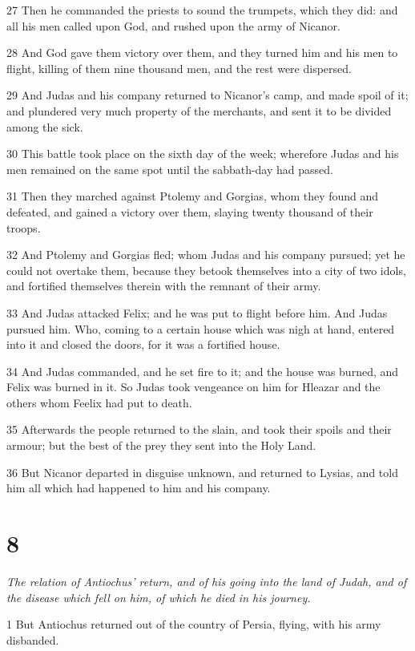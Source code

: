 27 Then he commanded the priests to sound the trumpets, which they did: and all his men called upon God, and rushed upon the army of Nicanor. 

28 And God gave them victory over them, and they turned him and his men to flight, killing of them nine thousand men, and the rest were dispersed. 

29 And Judas and his company returned to Nicanor’s camp, and made spoil of it; and plundered very much property of the merchants, and sent it to be divided among the sick. 

30 This battle took place on the sixth day of the week; wherefore Judas and his men remained on the same spot until the sabbath-day had passed. 

31 Then they marched against Ptolemy and Gorgias, whom they found and defeated, and gained a victory over them, slaying twenty thousand of their troops. 

32 And Ptolemy and Gorgias fled; whom Judas and his company pursued; yet he could not overtake them, because they betook themselves into a city of two idols, and fortified themselves therein with the remnant of their army. 

33 And Judas attacked Felix; and he was put to flight before him. And Judas pursued him. Who, coming to a certain house which was nigh at hand, entered into it and closed the doors, for it was a fortified house. 

34 And Judas commanded, and he set fire to it; and the house was burned, and Felix was burned in it. So Judas took vengeance on him for Hleazar and the others whom Feelix had put to death. 

35 Afterwards the people returned to the slain, and took their spoils and their armour; but the best of the prey they sent into the Holy Land. 

36 But Nicanor departed in disguise unknown, and returned to Lysias, and told him all which had happened to him and his company. 

\chapter{8}

\par \textit{The relation of Antiochus’ return, and of his going into the land of Judah, and of the disease which fell on him, of which he died in his journey.}

1 But Antiochus returned out of the country of Persia, flying, with his army disbanded. 

